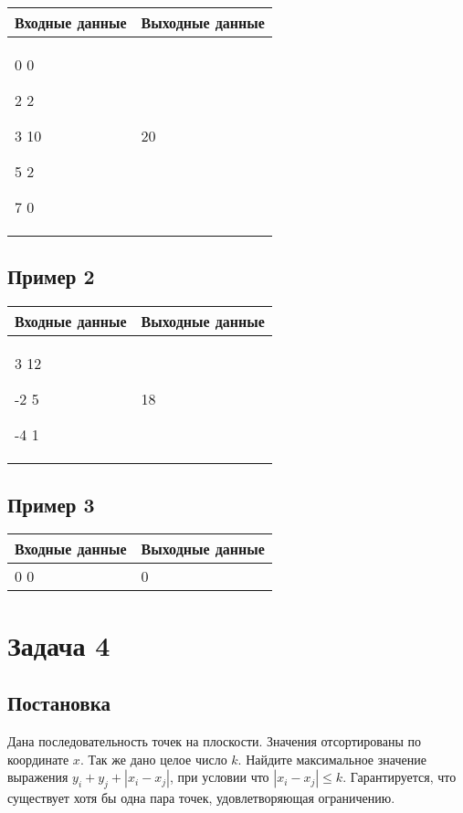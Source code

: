 \documentclass[a4]{article}
\begin{document}
\begin{table}[H]
\begin{center}
\begin{tabular}{|m{4cm}|m{4cm}|}
\hline
Входные данные & Выходные данные \\ \hline
0 0

2 2

3 10

5 2

7 0
&
20 
\\ \hline
\end{tabular}
\end{center}
\end{table}

\subsection*{Пример 2}
\label{sec:orge96f7c4}

\begin{table}[H]
\begin{center}
\begin{tabular}{|m{4cm}|m{4cm}|}
\hline
Входные данные & Выходные данные \\ \hline
3 12 

-2 5 

-4 1
&
18
\\ \hline
\end{tabular}
\end{center}
\end{table}
\subsection*{Пример 3}
\label{sec:orge96f7c4}

\begin{table}[H]
\begin{center}
\begin{tabular}{|m{4cm}|m{4cm}|}
\hline
Входные данные & Выходные данные \\ \hline
0 0
&
0
\\ \hline
\end{tabular}
\end{center}
\end{table}
\pagebreak
\section*{Задача 4}
\label{sec:org570b899}
\subsection*{Постановка}
\label{sec:orga2b5149}
Дана последовательность точек на плоскости. Значения отсортированы по координате $x$. Так же дано целое число $k$.
Найдите максимальное значение выражения $y_i + y_j + |x_i-x_j|$, при условии что  $|x_i-x_j|\leq k$. Гарантируется, что существует хотя бы одна пара точек, удовлетворяющая ограничению. 
\end{document}
